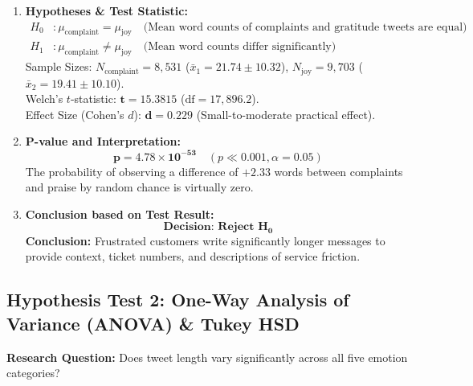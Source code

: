 \documentclass[11pt, a4paper]{article}
\begin{document}
\begin{enumerate}[leftmargin=1.5em]
    \item \textbf{Hypotheses \& Test Statistic:}
    \begin{align*}
        H_0 &: \mu_{\text{complaint}} = \mu_{\text{joy}} \quad \text{(Mean word counts of complaints and gratitude tweets are equal)} \\
        H_1 &: \mu_{\text{complaint}} \neq \mu_{\text{joy}} \quad \text{(Mean word counts differ significantly)}
    \end{align*}
    Sample Sizes: $N_{\text{complaint}} = 8,531$ ($\bar{x}_1 = 21.74 \pm 10.32$), $N_{\text{joy}} = 9,703$ ($\bar{x}_2 = 19.41 \pm 10.10$). \\
    Welch's $t$-statistic: $\mathbf{t = 15.3815}$ ($\text{df} = 17,896.2$). \\
    Effect Size (Cohen's $d$): $\mathbf{d = 0.229}$ (Small-to-moderate practical effect).
    
    \item \textbf{P-value and Interpretation:}
    $$\mathbf{p = 4.78 \times 10^{-53}} \quad (p \ll 0.001, \alpha = 0.05)$$
    The probability of observing a difference of $+2.33$ words between complaints and praise by random chance is virtually zero.
    
    \item \textbf{Conclusion based on Test Result:}
    $$\mathbf{\text{Decision: Reject } H_0}$$
    \textbf{Conclusion:} Frustrated customers write significantly longer messages to provide context, ticket numbers, and descriptions of service friction.
\end{enumerate}

\subsection*{Hypothesis Test 2: One-Way Analysis of Variance (ANOVA) \& Tukey HSD}
\noindent \textbf{Research Question:} Does tweet length vary significantly across all five emotion categories?
\end{document}
